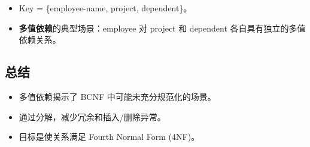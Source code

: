 \begin{itemize}
    \item Key = \{employee-name, project, dependent\}。
    \item \textbf{多值依赖}的典型场景：employee 对 project 和 dependent 各自具有独立的多值依赖关系。
\end{itemize}

\subsection{总结}

\begin{itemize}
    \item 多值依赖揭示了 BCNF 中可能未充分规范化的场景。
    \item 通过分解，减少冗余和插入/删除异常。
    \item 目标是使关系满足 Fourth Normal Form (4NF)。
\end{itemize}
